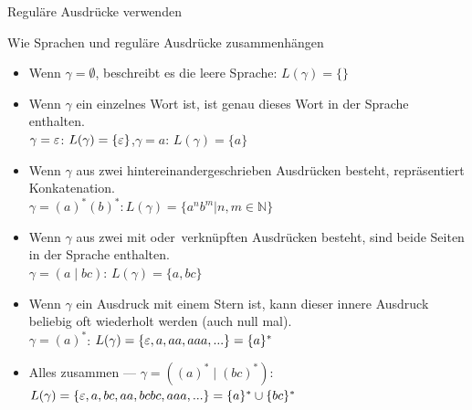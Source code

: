 \documentclass[10pt]{beamer}
\begin{document}
\begin{frame}{Reguläre Ausdrücke verwenden}
    \begin{exampleblock}{Wie Sprachen und reguläre Ausdrücke zusammenhängen}
    \footnotesize
    \begin{itemize}[<+- | alert@+>]
        \item Wenn $\gamma = \emptyset$, beschreibt es die leere Sprache: $L(\gamma) = \{\}$
        \item Wenn $\gamma$ ein einzelnes Wort ist, ist genau dieses Wort in der Sprache enthalten.\\
        $\gamma = \varepsilon$: $L(\gamma)=\{\varepsilon\}$,\quad$\gamma = a$: $L(\gamma)=\{a\}$
        \item Wenn $\gamma$ aus zwei hintereinandergeschrieben Ausdrücken besteht, repräsentiert Konkatenation.\\
        $\gamma = (a)^*(b)^*: L(\gamma)=\{a^nb^m|n,m\in\mathbb{N}\}$
        \item Wenn $\gamma$ aus zwei mit \glqq oder\grqq\ verknüpften Ausdrücken besteht, sind beide Seiten in der Sprache enthalten.\\
        $\gamma = (a \mid bc)$: $L(\gamma)=\{a, bc\}$
        \item Wenn $\gamma$ ein Ausdruck mit einem Stern ist, kann dieser innere Ausdruck beliebig oft wiederholt werden (auch null mal).\\
        $\gamma = (a)^*$: $L(\gamma)=\{\varepsilon, a, aa, aaa, ...\}=\{a\}^*$
        \item Alles zusammen --- $\gamma = ((a)^* \mid (bc)^*)$: $L(\gamma)=\{\varepsilon, a, bc, aa, bcbc, aaa, ...\} = \{a\}^* \cup \{bc\}^*$
    \end{itemize}
    \end{exampleblock}
\end{frame}
\end{document}
